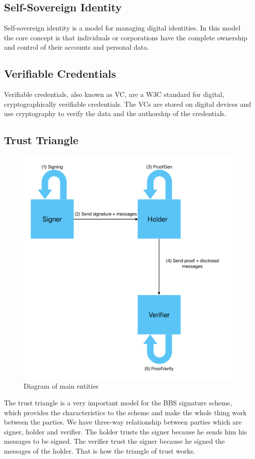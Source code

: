\documentclass{article}
\begin{document}
\subsection{Self-Sovereign Identity}

Self-sovereign identity is a model for managing digital identities. In this model the core concept is that individuals or corporations have the complete ownership and control of their accounts and personal data.

\subsection{Verifiable Credentials}

Verifiable credentials, also known as VC, are a \gls{W3C} standard for digital, cryptographically verifiable credentials. The VCs are stored on digital devices and use cryptography to verify the data and the authorship of the credentials. \cite{bbs-verifiable-credentials-blog}

\subsection{Trust Triangle}

\begin{figure}[H]
    \centering
    \includegraphics[width=0.5\linewidth]{diagram_entities.pdf}
    \caption{Diagram of main entities}
    \label{Fig: Diagram of the main entities}
\end{figure}

The trust triangle is a very important model for the BBS signature scheme, which provides the characteristics to the scheme and make the whole thing work between the parties. 
We have three-way relationship between parties which are signer, holder and verifier. The holder trusts the signer because he sends him his messages to be signed. 
The verifier trust the signer because he signed the messages of the holder. That is how the triangle of trust works. 
\end{document}
